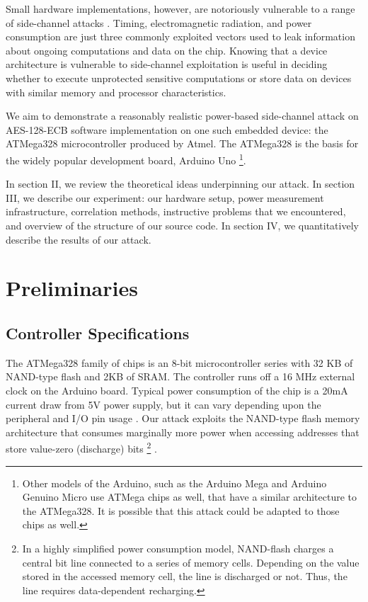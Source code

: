 \documentclass[journal]{ieee_style}
\begin{document}
Small hardware implementations, however, are notoriously vulnerable to a range of side-channel attacks \cite{smalldevice}. Timing, electromagnetic radiation, and power consumption are just three commonly exploited vectors used to leak information about ongoing computations and data on the chip. Knowing that a device architecture is vulnerable to side-channel exploitation is useful in deciding whether to execute unprotected sensitive computations or store data on devices with similar memory and processor characteristics.

We aim to demonstrate a reasonably realistic power-based side-channel attack on AES-128-ECB software implementation on one such embedded device: the ATMega328 microcontroller produced by Atmel. The ATMega328 is the basis for the widely popular development board, Arduino Uno \footnote{Other models of the Arduino, such as the Arduino Mega and Arduino Genuino Micro use ATMega chips as well, that have a similar architecture to the ATMega328. It is possible that this attack could be adapted to those chips as well.}.

In section II, we review the theoretical ideas underpinning our attack. In section III, we describe our experiment: our hardware setup, power measurement infrastructure, correlation methods, instructive problems that we encountered, and overview of the structure of our source code. In section IV, we quantitatively describe the results of our attack.

\section{Preliminaries}
\subsection{Controller Specifications}
The ATMega328 family of chips is an 8-bit microcontroller series with 32 KB of NAND-type flash and 2KB of SRAM. The controller runs off a 16 MHz external clock on the Arduino board. Typical power consumption of the chip is a 20mA current draw from 5V power supply, but it can vary depending upon the peripheral and I/O pin usage \cite{atmeldatasheet}. Our attack exploits the NAND-type flash memory architecture that consumes marginally more power when accessing addresses that store value-zero (discharge) bits \footnote{In a highly simplified power consumption model, NAND-flash charges a central bit line connected to a series of memory cells. Depending on the value stored in the accessed memory cell, the line is discharged or not. Thus, the line requires data-dependent recharging.} \cite{nandflash}.
\end{document}
